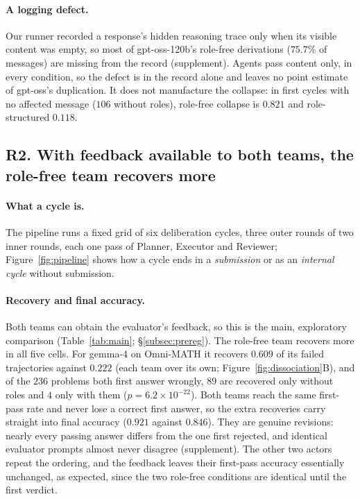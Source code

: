 \paragraph{A logging defect.} \label{subsec:logging} Our runner recorded
a response's hidden reasoning trace only when its visible content was
empty, so most of gpt-oss-120b's role-free derivations ($75.7\%$ of
messages) are missing from the record (supplement). Agents pass content
only, in every condition, so the defect is in the record alone and leaves
no point estimate of gpt-oss's duplication. It does not manufacture the
collapse: in first cycles with no affected message ($106$ without roles),
role-free collapse is $0.821$ and role-structured $0.118$.

\subsection{R2. With feedback available to both teams, the role-free team
recovers more}
\label{subsec:recovery}

\paragraph{What a cycle is.} The pipeline runs a fixed grid of six
deliberation cycles, three outer rounds of two inner rounds, each one pass
of Planner, Executor and Reviewer; Figure~\ref{fig:pipeline} shows how a
cycle ends in a \emph{submission} or as an \emph{internal cycle} without
submission.



\paragraph{Recovery and final accuracy.} Both teams can obtain the
evaluator's feedback, so this is the main, exploratory comparison
(Table~\ref{tab:main}; \S\ref{subsec:prereg}).
The role-free team recovers more in all five cells. For gemma-4 on
Omni-MATH it recovers $0.609$ of its failed trajectories against $0.222$
(each team over its own; Figure~\ref{fig:dissociation}B), and of the $236$
problems both first answer wrongly, $89$ are recovered only without roles
and $4$ only with them ($p=6.2\times10^{-22}$). Both teams reach the same
first-pass rate and never lose a correct first answer, so the extra
recoveries carry straight into final accuracy ($0.921$ against $0.846$).
They are genuine revisions: nearly every passing answer differs from the
one first rejected, and identical evaluator prompts almost never disagree
(supplement). The other two actors repeat the ordering, and the feedback
leaves their first-pass accuracy essentially unchanged, as expected, since the two
role-free conditions are identical until the first verdict.

